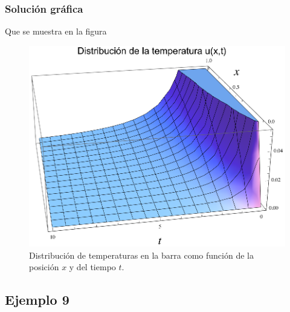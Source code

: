 \begin{frame}
\frametitle{Solución gráfica}
Que se muestra en la figura 
\end{frame}
\begin{frame}[plain]
\begin{figure}[H]
    \centering
    \includegraphics[scale=0.8]{Imagenes/Plot_Ejemplo_06_02.eps}
    \caption{Distribución de temperaturas en la barra como función de la posición $x$ y del tiempo $t$.}
    \label{fig:figura_plot_Ejemplo_06_02}
\end{figure}
\end{frame}

\subsection*{Ejemplo 9}

